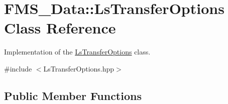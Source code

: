\hypertarget{classFMS__Data_1_1LsTransferOptions}{
\section{FMS\_\-Data::LsTransferOptions Class Reference}
\label{classFMS__Data_1_1LsTransferOptions}
}


Implementation of the \hyperlink{classFMS__Data_1_1LsTransferOptions}{LsTransferOptions} class.  




{\ttfamily \#include $<$LsTransferOptions.hpp$>$}

\subsection*{Public Member Functions}
